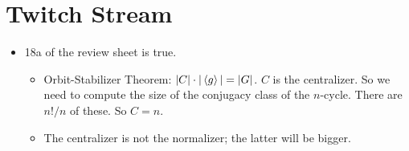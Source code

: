 \documentclass[../notes.tex]{subfiles}
\begin{document}
\section{Twitch Stream}
\begin{itemize}
    \item {}18a of the review sheet is true.
    \begin{itemize}
        \item Orbit-Stabilizer Theorem: $|C|\cdot|\left\langle{g}\right\rangle|=|G|$. $C$ is the centralizer. So we need to compute the size of the conjugacy class of the $n$-cycle. There are $n!/n$ of these. So $C=n$.
        \item The centralizer is not the normalizer; the latter will be bigger.
    \end{itemize}
\end{itemize}
\end{document}
